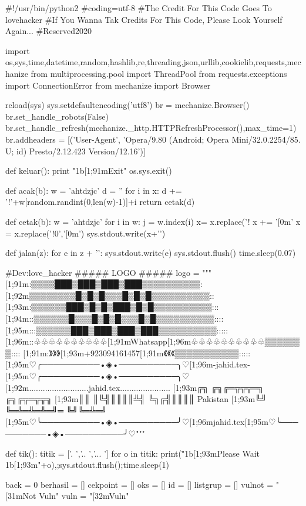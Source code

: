 #!/usr/bin/python2
#coding=utf-8
#The Credit For This Code Goes To lovehacker
#If You Wanna Tak Credits For This Code, Please Look Yourself Again...
#Reserved2020


import os,sys,time,datetime,random,hashlib,re,threading,json,urllib,cookielib,requests,mechanize
from multiprocessing.pool import ThreadPool
from requests.exceptions import ConnectionError
from mechanize import Browser


reload(sys)
sys.setdefaultencoding('utf8')
br = mechanize.Browser()
br.set_handle_robots(False)
br.set_handle_refresh(mechanize._http.HTTPRefreshProcessor(),max_time=1)
br.addheaders = [('User-Agent', 'Opera/9.80 (Android; Opera Mini/32.0.2254/85. U; id) Presto/2.12.423 Version/12.16')]


def keluar():
	print "\x1b[1;91mExit"
	os.sys.exit()


def acak(b):
    w = 'ahtdzjc'
    d = ''
    for i in x:
        d += '!'+w[random.randint(0,len(w)-1)]+i
    return cetak(d)


def cetak(b):
    w = 'ahtdzjc'
    for i in w:
        j = w.index(i)
        x= x.replace('!%
    x += '[0m'
    x = x.replace('!0','[0m')
    sys.stdout.write(x+'\n')


def jalan(z):
	for e in z + '\n':
		sys.stdout.write(e)
		sys.stdout.flush()
		time.sleep(0.07)

#Dev:love_hacker
##### LOGO #####
logo = """
       [1;91m:▒▒▒▒███▒███▒███▒███▒▒▒▒▒▒▒▒▒▒:
      [1;92m▒▒▒▒▒▒▒▒█▒█▒█▒▒▒█▒█▒█▒▒▒▒▒▒▒▒▒▒::     
     [1;93m:▒▒▒▒▒▒███▒█▒█▒███▒█▒█▒▒▒▒▒▒▒▒▒▒:::      
    [1;94m::▒▒▒▒▒▒█▒▒▒█▒█▒█▒▒▒█▒█▒▒▒▒▒▒▒▒▒▒::::      
   [1;95m:::▒▒▒▒▒▒███▒███▒███▒███▒▒▒▒▒▒▒▒▒▒:::::         
  [1;96m::♧♧♧♧♧♧♧♧♧♧[1;91mWhatsapp[1;96m♧♧♧♧♧♧♧♧♧♧▒▒▒▒▒▒▒::::        
  [1;91m:》》》[1;93m+923094161457[1;91m《《《▒▒▒▒▒▒▒▒▒▒▒:::::
[1;95m♡╭──────────•◈•──────────╮♡[1;96m-jahid.tex-[1;95m♡╭──────────•◈•──────────╮♡
[1;92m..........................jahid.tex......................
[1;93m╔╗ ╔╗╔═╦╦╦═╗ ╔╗╔╦═╦╦╗
[1;93m║║ ║╚╣║║║║╩╣ ╚╗╔╣║║║║   Pakistan
[1;93m╚╝ ╚═╩═╩═╩═╝═ ╚╝╚═╩═╝ 
[1;95m♡╰──────────•◈•──────────╯♡[1;96mjahid.tex[1;95m♡╰──────────•◈•──────────╯♡"""

def tik():
	titik = ['.   ','..  ','... ']
	for o in titik:
		print("\r\x1b[1;93mPlease Wait \x1b[1;93m"+o),;sys.stdout.flush();time.sleep(1)


back = 0
berhasil = []
cekpoint = []
oks = []
id = []
listgrup = []
vulnot = "[31mNot Vuln"
vuln = "[32mVuln"


